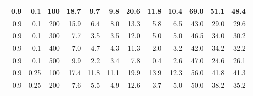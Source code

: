 \begin{longtable}{|r|r|r|r|r|r|r|r|r|r|r|r|}
        \hline \
        0.9                            & 0.1                     & 100                       & 18.7                       & 9.7                       & 9.8                       & 20.6                      & 11.8                       & 10.4                       & 69.0                      & 51.1                      & 48.4                      \\
        \hline \
        0.9                            & 0.1                     & 200                       & 15.9                       & 6.4                       & 8.0                       & 13.3                      & 5.8                       & 6.5                       & 43.0                      & 29.0                      & 29.6                      \\
        \hline \
        0.9                            & 0.1                     & 300                       & 7.7                       & 3.5                       & 3.5                       & 12.0                       & 5.0                       & 5.0                       & 46.5                      & 34.0                      & 30.2                      \\
        \hline \
        0.9                            & 0.1                    & 400                       & 7.0                      & 4.7                      & 4.3                      & 11.3                      & 2.0                      & 3.2                      & 42.0                      & 34.2                      & 32.2                      \\
        \hline \
        0.9                            & 0.1                    & 500                       & 9.9                       & 2.2                       & 3.4                       & 7.8                      & 0.4                       & 2.6                       & 47.0                      & 24.6                      & 26.1                      \\
        \hline \
        0.9                            & 0.25                    & 100                       & 17.4                      & 11.8                       & 11.1                       & 19.9                      & 13.9                       & 12.3                       & 56.0                      & 41.8                      & 41.3                      \\
        \hline \
        0.9                            & 0.25                    & 200                       & 7.6                       & 5.5                       & 4.9                       & 12.6                      & 3.7                       & 5.0                       & 50.0                      & 38.2                      & 35.2                      \\

\end{longtable}
